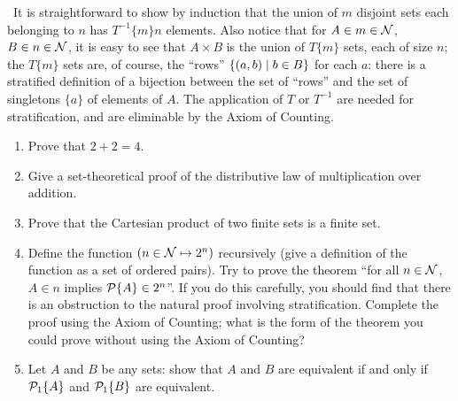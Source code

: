 \preuve\ It is straightforward to show by induction that the
union of $m$ disjoint sets each belonging to $n$ has $T^{-1}\{m\}n$
elements. Also notice that for $A \in m \in {\cal N}$, $B \in n\in
{\cal N}$, it is easy to see that $A \times B$ is the union of
$T\{m\}$ sets, each of size $n$; the $T\{m\}$ sets are, of course, the
``rows'' $\{(a,b)\mid b \in B\}$ for each $a$: there is a
stratified definition of a bijection
between the set of ``rows'' and the set of singletons
$\{a\}$ of elements of $A$.  The application of $T$ or $T^{-1}$ are needed 
for stratification, and are eliminable by the Axiom of
Counting.
\finpreuve


\Exercises

\begin{enumerate}
 \item  Prove that $2 + 2 = 4$.

 \item  Give a set-theoretical proof of the distributive law of
   multiplication over
   addition.

 \item  Prove that the Cartesian product of two
   finite sets is a finite set.

 \item  Define the function $(n \in {\cal N}\mapsto2^n)$
   recursively (give a definition of the function as a set of
   ordered pairs).  Try to prove the theorem ``for all $n
   \in {\cal N}$, $A \in n$ implies ${\cal P}\{A\} \in 2^n$''.  If you do this
   carefully, you should find that there is an obstruction to the
   natural proof involving
   stratification.  Complete the proof using the Axiom of
   Counting; what is the form of the theorem you could
   prove without using the Axiom of Counting?

\item Let $A$ and $B$ be any sets:  show that $A$ and $B$ are equivalent if and only if ${\cal P}_1\{A\}$ and ${\cal P}_1\{B\}$ are equivalent.

\end{enumerate}
